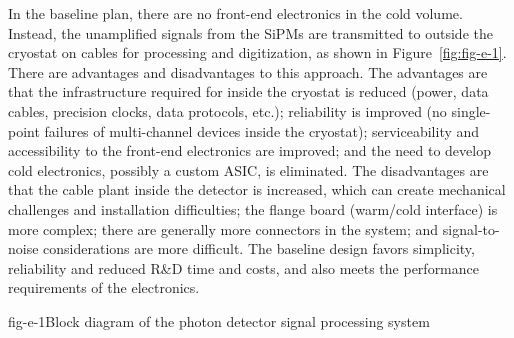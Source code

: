 In the baseline \fixme{} plan, there are no front-end electronics in the cold
volume.  Instead, the unamplified signals from the SiPMs are
transmitted to outside the cryostat on cables for processing and
digitization, as shown in Figure~\ref{fig:fig-e-1}.  There are
advantages and disadvantages to this approach.  The advantages are
that the infrastructure required for inside the cryostat is reduced
(power, data cables, precision clocks, data protocols, etc.);
reliability is improved (no single-point failures of multi-channel
devices inside the cryostat); serviceability and accessibility to the
front-end electronics are improved; and the need to develop cold
electronics, possibly a custom ASIC, is eliminated.  The disadvantages
are that the cable plant inside the detector is increased, which can
create mechanical challenges and installation difficulties; the flange
board (warm/cold interface) is more complex; there are generally more
connectors in the system; and signal-to-noise considerations are more
difficult.  %
The baseline  \fixme{} design favors simplicity,
reliability and reduced R\&D time and costs, and also meets the
performance requirements of the electronics.
%
%
\begin{cdrfigure}{fig-e-1}{Block diagram of the photon detector signal processing system}
\end{cdrfigure}

